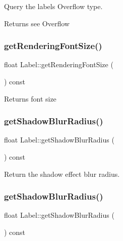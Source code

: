 Query the label\textquotesingle{}s Overflow type.

\begin{DoxyReturn}{Returns}
see {\ttfamily Overflow} 
\end{DoxyReturn}
\mbox{\label{classLabel_a832e00fc1f2944499ed96871cdc43fa8}} 
\subsubsection{\texorpdfstring{get\+Rendering\+Font\+Size()}{getRenderingFontSize()}}
{\footnotesize\ttfamily float Label\+::get\+Rendering\+Font\+Size (\begin{DoxyParamCaption}{ }\end{DoxyParamCaption}) const}

Returns font size \mbox{\label{classLabel_a6d187422565a9368e03e1f71e39efbd3}} 
\subsubsection{\texorpdfstring{get\+Shadow\+Blur\+Radius()}{getShadowBlurRadius()}\hspace{0.1cm}{\footnotesize\ttfamily [1/2]}}
{\footnotesize\ttfamily float Label\+::get\+Shadow\+Blur\+Radius (\begin{DoxyParamCaption}{ }\end{DoxyParamCaption}) const\hspace{0.3cm}{\ttfamily [inline]}}

Return the shadow effect blur radius. \mbox{\label{classLabel_a6d187422565a9368e03e1f71e39efbd3}} 
\subsubsection{\texorpdfstring{get\+Shadow\+Blur\+Radius()}{getShadowBlurRadius()}\hspace{0.1cm}{\footnotesize\ttfamily [2/2]}}
{\footnotesize\ttfamily float Label\+::get\+Shadow\+Blur\+Radius (\begin{DoxyParamCaption}{ }\end{DoxyParamCaption}) const\hspace{0.3cm}{\ttfamily [inline]}}

